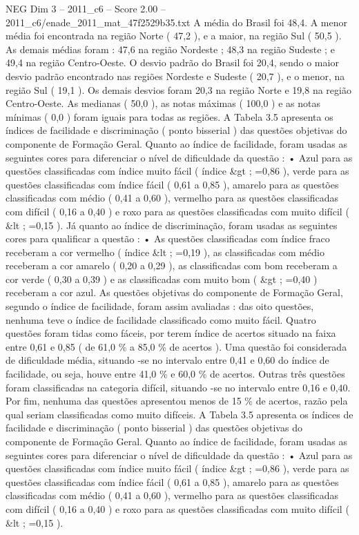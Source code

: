 \begin{textsample}{NEG Dim 3 – 2011\_c6 – Score 2.00 – 2011\_c6/enade\_2011\_mat\_47f2529b35.txt}
A média do Brasil foi 48,4.
A menor média foi encontrada na região Norte ( 47,2 ), e a maior, na região Sul ( 50,5 ).
As demais médias foram : 47,6 na região Nordeste ; 48,3 na região Sudeste ; e 49,4 na região Centro-Oeste.
O desvio padrão do Brasil foi 20,4, sendo o maior desvio padrão encontrado nas regiões Nordeste e Sudeste ( 20,7 ), e o menor, na região Sul ( 19,1 ).
Os demais desvios foram 20,3 na região Norte e 19,8 na região Centro-Oeste.
As medianas ( 50,0 ), as notas máximas ( 100,0 ) e as notas mínimas ( 0,0 ) foram iguais para todas as regiões.
A Tabela 3.5 apresenta os índices de facilidade e discriminação ( ponto bisserial ) das questões objetivas do componente de Formação Geral.
Quanto ao índice de facilidade, foram usadas as seguintes cores para diferenciar o nível de dificuldade da questão : • Azul para as questões classificadas com índice muito fácil ( índice \&gt ; =0,86 ), verde para as questões classificadas com índice fácil ( 0,61 a 0,85 ), amarelo para as questões classificadas com médio ( 0,41 a 0,60 ), vermelho para as questões classificadas com difícil ( 0,16 a 0,40 ) e roxo para as questões classificadas com muito difícil ( \&lt ; =0,15 ).
Já quanto ao índice de discriminação, foram usadas as seguintes cores para qualificar a questão : • As questões classificadas com índice fraco receberam a cor vermelho ( índice \&lt ; =0,19 ), as classificadas com médio receberam a cor amarelo ( 0,20 a 0,29 ), as classificadas com bom receberam a cor verde ( 0,30 a 0,39 ) e as classificadas com muito bom ( \&gt ; =0,40 ) receberam a cor azul.
As questões objetivas do componente de Formação Geral, segundo o índice de facilidade, foram assim avaliadas : das oito questões, nenhuma teve o índice de facilidade classificado como muito fácil.
Quatro questões foram tidas como fáceis, por terem índice de acertos situado na faixa entre 0,61 e 0,85 ( de 61,0 \% a 85,0 \% de acertos ).
Uma questão foi considerada de dificuldade média, situando -se no intervalo entre 0,41 e 0,60 do índice de facilidade, ou seja, houve entre 41,0 \% e 60,0 \% de acertos.
Outras três questões foram classificadas na categoria difícil, situando -se no intervalo entre 0,16 e 0,40.
Por fim, nenhuma das questões apresentou menos de 15 \% de acertos, razão pela qual seriam classificadas como muito difíceis.
A Tabela 3.5 apresenta os índices de facilidade e discriminação ( ponto bisserial ) das questões objetivas do componente de Formação Geral.
Quanto ao índice de facilidade, foram usadas as seguintes cores para diferenciar o nível de dificuldade da questão : • Azul para as questões classificadas com índice muito fácil ( índice \&gt ; =0,86 ), verde para as questões classificadas com índice fácil ( 0,61 a 0,85 ), amarelo para as questões classificadas com médio ( 0,41 a 0,60 ), vermelho para as questões classificadas com difícil ( 0,16 a 0,40 ) e roxo para as questões classificadas com muito difícil ( \&lt ; =0,15 ).

\end{textsample}
